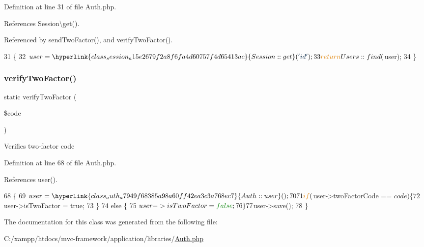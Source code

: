 Definition at line 31 of file Auth.\+php.



References Session\textbackslash{}get().



Referenced by send\+Two\+Factor(), and verify\+Two\+Factor().


\begin{DoxyCode}
31                                   \{
32         $user = \hyperlink{class_session_a15e2679f2a8f6fa4d60757f4d65413ac}{Session::get}(\textcolor{stringliteral}{'id'});
33         \textcolor{keywordflow}{return} Users::find($user);
34     \}
\end{DoxyCode}
\hypertarget{class_auth_a44cd32430eda0860d3d5a4e4a210a106}{}\label{class_auth_a44cd32430eda0860d3d5a4e4a210a106} 
\subsubsection{\texorpdfstring{verify\+Two\+Factor()}{verifyTwoFactor()}}
{\footnotesize\ttfamily static verify\+Two\+Factor (\begin{DoxyParamCaption}\item[{}]{\$code }\end{DoxyParamCaption})\hspace{0.3cm}{\ttfamily [static]}}

Verifies two-\/factor code 

Definition at line 68 of file Auth.\+php.



References user().


\begin{DoxyCode}
68                                                   \{
69         $user = \hyperlink{class_auth_a7949f68385a98a60ff42ea3c3a768ec7}{Auth::user}();
70 
71         \textcolor{keywordflow}{if} ($user->twoFactorCode == $code) \{
72             $user->isTwoFactor = \textcolor{keyword}{true};
73         \}
74         \textcolor{keywordflow}{else} \{
75             $user->isTwoFactor = \textcolor{keyword}{false};
76         \}
77         $user->save();
78     \}
\end{DoxyCode}


The documentation for this class was generated from the following file\+:\begin{DoxyCompactItemize}
\item 
C\+:/xampp/htdocs/mvc-\/framework/application/libraries/\hyperlink{_auth_8php}{Auth.\+php}\end{DoxyCompactItemize}
